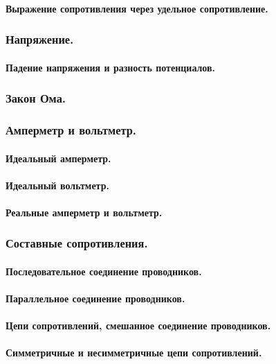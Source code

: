 \documentclass{article}
\begin{document}
            \paragraph{Выражение сопротивления через удельное сопротивление.}
        \subsubsection{Напряжение.}
            \paragraph{Падение напряжения и разность потенциалов.}
        \subsubsection{Закон Ома.}
        \subsubsection{Амперметр и вольтметр.}
            \paragraph{Идеальный амперметр.}
            \paragraph{Идеальный вольтметр.}
            \paragraph{Реальные амперметр и вольтметр.}
        \subsubsection{Составные сопротивления.}
            \paragraph{Последовательное соединение проводников.}
            \paragraph{Параллельное соединение проводников.}
            \paragraph{Цепи сопротивлений, смешанное соединение проводников.}
            \paragraph{Симметричные и несимметричные цепи сопротивлений.}
\end{document}
